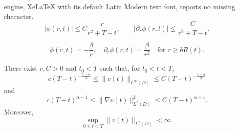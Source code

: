 \documentclass[10pt,a4paper]{amsart}
\begin{document}
engine, XeLaTeX with its default Latin Modern text font, reports no missing character.
\begin{equation}
\label{eq:phi-pointwise}
    |\phi(r,t)|\leq C\frac r{r^2+T-t},
    \qquad
    |\partial_r\phi(r,t)|\leq\frac C{r^2+T-t}.
\end{equation}

\begin{equation}
\label{eq:outer-phi}
    \phi(r,t)=-\frac\beta r,
    \quad
    \partial_r\phi(r,t)=\frac\beta{r^2}
    \quad\text{for }r\geq bR(t).
\end{equation}

\begin{lemma}
\label{lem:velocity-rates}
There exist $c,C>0$ and $t_0<T$ such that, for $t_0<t<T$,
\begin{equation}
\label{eq:velocity-rate}
    c(T-t)^{-\frac{1-\alpha}{2}}
    \leq\|v(t)\|_{L^\infty(D)}
    \leq C(T-t)^{-\frac{1-\alpha}{2}}
\end{equation}
and
\begin{equation}
\label{eq:gradient-rate}
    c(T-t)^{\alpha-1}
    \leq\|\nabla v(t)\|_{L^2(D)}^2
    \leq C(T-t)^{\alpha-1}.
\end{equation}
Moreover,
\begin{equation}
\label{eq:L2-uniform}
    \sup_{0\leq t<T}\|v(t)\|_{L^2(D)}<\infty.
\end{equation}
\end{lemma}
\end{document}
